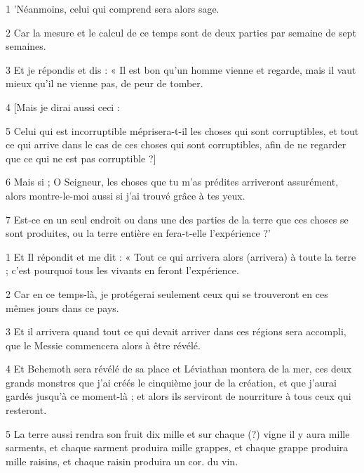 \par 1 'Néanmoins, celui qui comprend sera alors sage.

\par 2 Car la mesure et le calcul de ce temps sont de deux parties par semaine de sept semaines.

\par 3 Et je répondis et dis : « Il est bon qu'un homme vienne et regarde, mais il vaut mieux qu'il ne vienne pas, de peur de tomber.

\par 4 [Mais je dirai aussi ceci :

\par 5 Celui qui est incorruptible méprisera-t-il les choses qui sont corruptibles, et tout ce qui arrive dans le cas de ces choses qui sont corruptibles, afin de ne regarder que ce qui ne est pas corruptible ?]

\par 6 Mais si ; O Seigneur, les choses que tu m'as prédites arriveront assurément, alors montre-le-moi aussi si j'ai trouvé grâce à tes yeux.

\par 7 Est-ce en un seul endroit ou dans une des parties de la terre que ces choses se sont produites, ou la terre entière en fera-t-elle l'expérience ?'


\par 1 Et Il répondit et me dit : « Tout ce qui arrivera alors (arrivera) à toute la terre ; c'est pourquoi tous les vivants en feront l'expérience.

\par 2 Car en ce temps-là, je protégerai seulement ceux qui se trouveront en ces mêmes jours dans ce pays.

\par 3 Et il arrivera quand tout ce qui devait arriver dans ces régions sera accompli, que le Messie commencera alors à être révélé.

\par 4 Et Behemoth sera révélé de sa place et Léviathan montera de la mer, ces deux grands monstres que j'ai créés le cinquième jour de la création, et que j'aurai gardés jusqu'à ce moment-là ; et alors ils serviront de nourriture à tous ceux qui resteront.

\par 5 La terre aussi rendra son fruit dix mille et sur chaque (?) vigne il y aura mille sarments, et chaque sarment produira mille grappes, et chaque grappe produira mille raisins, et chaque raisin produira un cor. du vin.

